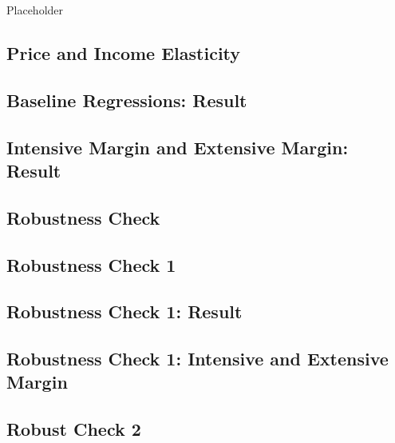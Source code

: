 \documentclass[ review  , 3p ]{elsarticle}
\begin{document}
  Placeholder
  
  \hypertarget{price-and-income-elasticity}{%
  \subsection{Price and Income Elasticity}\label{price-and-income-elasticity}}
  
  \hypertarget{baseline-regressions-result}{%
  \subsection{Baseline Regressions: Result}\label{baseline-regressions-result}}
  
  \hypertarget{intensive-margin-and-extensive-margin-result}{%
  \subsection{Intensive Margin and Extensive Margin: Result}\label{intensive-margin-and-extensive-margin-result}}
  
  \hypertarget{robustness-check}{%
  \subsection{Robustness Check}\label{robustness-check}}
  
  \hypertarget{robustness-check-1}{%
  \subsection{Robustness Check 1}\label{robustness-check-1}}
  
  \hypertarget{robustness-check-1-result}{%
  \subsection{Robustness Check 1: Result}\label{robustness-check-1-result}}
  
  \hypertarget{robustness-check-1-intensive-and-extensive-margin}{%
  \subsection{Robustness Check 1: Intensive and Extensive Margin}\label{robustness-check-1-intensive-and-extensive-margin}}
  
  \hypertarget{robust-check-2}{%
  \subsection{Robust Check 2}\label{robust-check-2}}
  
\end{document}
